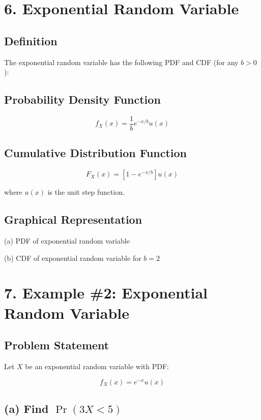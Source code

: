 \documentclass[12pt]{article}
\begin{document}
\section*{6. Exponential Random Variable}

\subsection*{Definition}

The exponential random variable has the following PDF and CDF (for any $b > 0$):

\subsection*{Probability Density Function}

\[
f_X(x) = \frac{1}{b} e^{-x/b} u(x)
\]

\subsection*{Cumulative Distribution Function}

\[
F_X(x) = \left[1 - e^{-x/b}\right] u(x)
\]

where $u(x)$ is the unit step function.

\subsection*{Graphical Representation}

(a) PDF of exponential random variable

(b) CDF of exponential random variable for $b = 2$

\section*{7. Example \#2: Exponential Random Variable}

\subsection*{Problem Statement}

Let $X$ be an exponential random variable with PDF:

\[
f_X(x) = e^{-x} u(x)
\]

\subsection*{(a) Find $\Pr(3X < 5)$}
\end{document}
